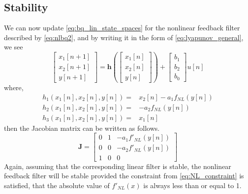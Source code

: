 \documentclass[twoside,a4paper]{article}
\begin{document}
\subsection{Stability}
%
We can now update \cref{eq:bq_lin_state_spaces} for the nonlinear
feedback filter described by \cref{eq:nlbq2}, and by writing it in the form
of \cref{eq:lyapunov_general}, we see
%
\begin{equation}
    \begin{bmatrix} x_1[n+1] \\ x_2[n+1] \\ y[n+1] \end{bmatrix} =
    \mathbf{h} \left( \begin{bmatrix} x_1[n] \\ x_2[n] \\ y[n] \end{bmatrix}
    \right) + \begin{bmatrix} b_1\\ b_2\\ b_0 \end{bmatrix} u[n]
    \label{eq:nlbq2_states}
\end{equation}
%
where,
%
\begin{equation}
    \begin{split}
        h_1(x_1[n], x_2[n], y[n]) =& x_2[n] - a_1f_{NL}(y[n]) \\
        h_2(x_1[n], x_2[n], y[n]) =& -a_2f_{NL}(y[n]) \\
        h_3(x_1[n], x_2[n], y[n]) =& x_1[n]
    \end{split}
    \label{eq:nlbq2_state_eqns2}
\end{equation}
%
then the Jacobian matrix can be written as follows.
%
\begin{equation}
    \mathbf{J} = \begin{bmatrix}
        0& 1& -a_1f'_{NL}(y[n]) \\
        0& 0& -a_2f'_{NL}(y[n]) \\
        1& 0& 0
    \end{bmatrix}
    \label{eq:nlbq2_Jacobian}
\end{equation}
%
Again, assuming that the corresponding linear filter is stable, the
nonlinear feedback filter will be stable provided the constraint
from \cref{eq:NL_constraint} is satisfied, that the absolute value
of $f'_{NL}(x)$ is always less than or equal to 1.
%
\end{document}
